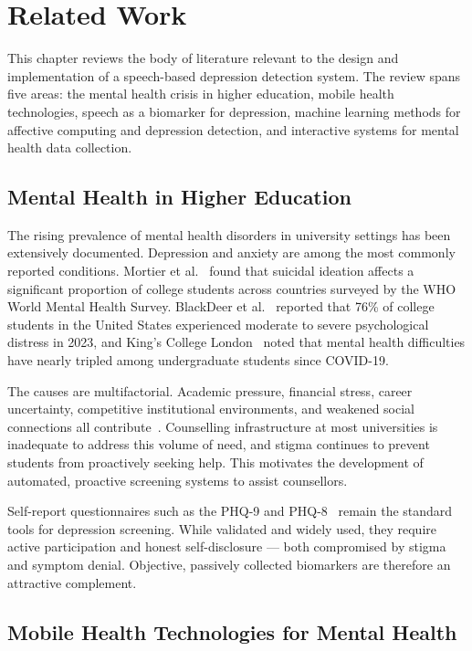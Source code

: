 \chapter{Related Work}
\label{Chapter2}

This chapter reviews the body of literature relevant to the design and implementation of a speech-based depression detection system. The review spans five areas: the mental health crisis in higher education, mobile health technologies, speech as a biomarker for depression, machine learning methods for affective computing and depression detection, and interactive systems for mental health data collection.

\section{Mental Health in Higher Education}

The rising prevalence of mental health disorders in university settings has been extensively documented. Depression and anxiety are among the most commonly reported conditions. Mortier et al.~\cite{Mortier2018} found that suicidal ideation affects a significant proportion of college students across countries surveyed by the WHO World Mental Health Survey. BlackDeer et al.~\cite{BlackDeer2023} reported that 76\% of college students in the United States experienced moderate to severe psychological distress in 2023, and King's College London~\cite{KCL2022} noted that mental health difficulties have nearly tripled among undergraduate students since COVID-19.

The causes are multifactorial. Academic pressure, financial stress, career uncertainty, competitive institutional environments, and weakened social connections all contribute~\cite{Mortier2018}. Counselling infrastructure at most universities is inadequate to address this volume of need, and stigma continues to prevent students from proactively seeking help. This motivates the development of automated, proactive screening systems to assist counsellors.

Self-report questionnaires such as the PHQ-9 and PHQ-8~\cite{Kroenke2010} remain the standard tools for depression screening. While validated and widely used, they require active participation and honest self-disclosure — both compromised by stigma and symptom denial. Objective, passively collected biomarkers are therefore an attractive complement.

\section{Mobile Health Technologies for Mental Health}


